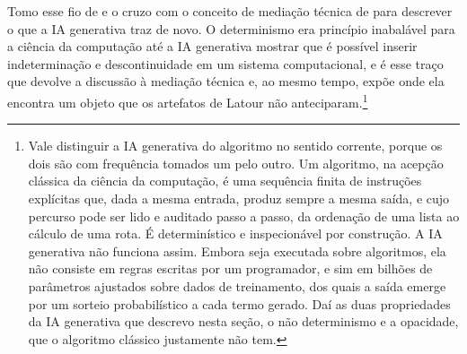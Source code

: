 Tomo esse fio de \textcite{Pinhanez2026Seminar, Pinhanez2025Small} e o cruzo com o conceito de mediação técnica de \textcite{Latour2017Esperanca} para descrever o que a IA generativa traz de novo. O determinismo era princípio inabalável para a ciência da computação até a IA generativa mostrar que é possível inserir indeterminação e descontinuidade em um sistema computacional, e é esse traço que devolve a discussão à mediação técnica e, ao mesmo tempo, expõe onde ela encontra um objeto que os artefatos de Latour não anteciparam.\footnote{Vale distinguir a IA generativa do algoritmo no sentido corrente, porque os dois são com frequência tomados um pelo outro. Um algoritmo, na acepção clássica da ciência da computação, é uma sequência finita de instruções explícitas que, dada a mesma entrada, produz sempre a mesma saída, e cujo percurso pode ser lido e auditado passo a passo, da ordenação de uma lista ao cálculo de uma rota. É determinístico e inspecionável por construção. A IA generativa não funciona assim. Embora seja executada sobre algoritmos, ela não consiste em regras escritas por um programador, e sim em bilhões de parâmetros ajustados sobre dados de treinamento, dos quais a saída emerge por um sorteio probabilístico a cada termo gerado. Daí as duas propriedades da IA generativa que descrevo nesta seção, o não determinismo e a opacidade, que o algoritmo clássico justamente não tem.}

